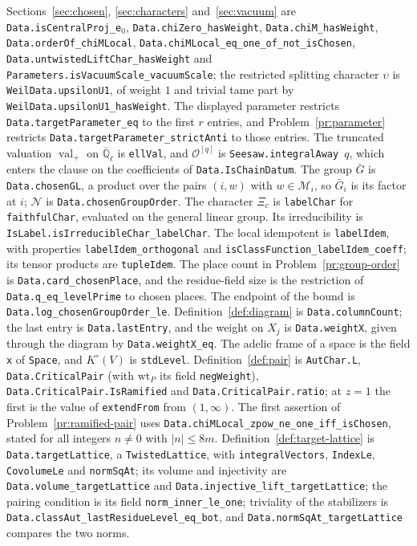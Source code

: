 \documentclass[reqno]{amsart}
\theoremstyle{plain}
\theoremstyle{definition}
\newcommand{\Q}{{\mathbb{Q}}}
\newcommand{\Oc}{\mathcal O}
\begin{document}
\begin{sloppypar}
Sections~\ref{sec:chosen}, \ref{sec:characters} and~\ref{sec:vacuum} are \texttt{Data.isCentralProj\_e\(_0\)}, \texttt{Data.chiZero\_hasWeight}, \texttt{Data.chiM\_hasWeight}, \texttt{Data.orderOf\_chiMLocal}, \texttt{Data.chiMLocal\_eq\_one\_of\_not\_isChosen}, \texttt{Data.untwistedLiftChar\_hasWeight} and \texttt{Parameters.isVacuumScale\_vacuumScale}; the restricted splitting character \(\upsilon\) is \texttt{WeilData.upsilonU1}, of weight \(1\) and trivial tame part by \texttt{WeilData.upsilonU1\_hasWeight}.  The displayed parameter restricts \texttt{Data.targetParameter\_eq} to the first \(r\) entries, and Problem~\ref{pr:parameter} restricts \texttt{Data.targetParameter\_strictAnti} to those entries.  The truncated valuation \(\operatorname{val}_+\) on \(\overline{\Q}_\ell\) is \texttt{ellVal}, and \(\Oc^{[q]}\) is \texttt{Seesaw.integralAway}~\(q\), which enters the clause on the coefficients of \texttt{Data.IsChainDatum}.  The group \(\bar G\) is \texttt{Data.chosenGL}, a product over the pairs \((i, w)\) with \(w \in \mathcal M_i\), so \(\bar G_i\) is its factor at \(i\); \(\mathcal N\) is \texttt{Data.chosenGroupOrder}.  The character \(\Xi_c\) is \texttt{labelChar} for \texttt{faithfulChar}, evaluated on the general linear group.  Its irreducibility is \texttt{IsLabel.isIrreducibleChar\_labelChar}.  The local idempotent is \texttt{labelIdem}, with properties \texttt{labelIdem\_orthogonal} and \texttt{isClassFunction\_labelIdem\_coeff}; its tensor products are \texttt{tupleIdem}.  The place count in Problem~\ref{pr:group-order} is \texttt{Data.card\_chosenPlace}, and the residue-field size is the restriction of \texttt{Data.q\_eq\_levelPrime} to chosen places.  The endpoint of the bound is \texttt{Data.log\_chosenGroupOrder\_le}.  Definition~\ref{def:diagram} is \texttt{Data.columnCount}; the last entry is \texttt{Data.lastEntry}, and the weight on \(X_j\) is \texttt{Data.weightX}, given through the diagram by \texttt{Data.weightX\_eq}.  The adelic frame of a space is the field \texttt{x} of \texttt{Space}, and \(K^\circ(V)\) is \texttt{stdLevel}.  Definition~\ref{def:pair} is \texttt{AutChar.L}, \texttt{Data.CriticalPair} (with \(\mathrm{wt}_P\) its field \texttt{negWeight}), \texttt{Data.CriticalPair.IsRamified} and \texttt{Data.CriticalPair.ratio}; at \(z = 1\) the first is the value of \texttt{extendFrom} from \((1, \infty)\).  The first assertion of Problem~\ref{pr:ramified-pair} uses \texttt{Data.chiMLocal\_zpow\_ne\_one\_iff\_isChosen}, stated for all integers \(n \ne 0\) with \(\lvert n \rvert \le 8m\).  Definition~\ref{def:target-lattice} is \texttt{Data.targetLattice}, a \texttt{TwistedLattice}, with \texttt{integralVectors}, \texttt{IndexLe}, \texttt{CovolumeLe} and \texttt{normSqAt}; its volume and injectivity are \texttt{Data.volume\_targetLattice} and \texttt{Data.injective\_lift\_targetLattice}; the pairing condition is its field \texttt{norm\_inner\_le\_one}; triviality of the stabilizers is \texttt{Data.classAut\_lastResidueLevel\_eq\_bot}, and \texttt{Data.normSqAt\_targetLattice} compares the two norms.
\end{sloppypar}
\end{document}
